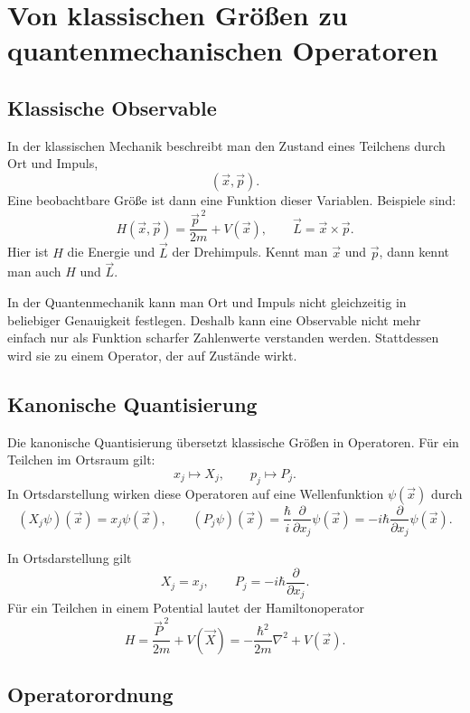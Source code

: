 \section{Von klassischen Größen zu quantenmechanischen Operatoren}

\subsection{Klassische Observable}

In der klassischen Mechanik beschreibt man den Zustand eines Teilchens durch Ort und Impuls,
\[
    (\vec x,\vec p).
\]
Eine beobachtbare Größe ist dann eine Funktion dieser Variablen. Beispiele sind:
\[
    H(\vec x,\vec p)=\frac{\vec p^{\,2}}{2m}+V(\vec x),
    \qquad
    \vec L=\vec x\times \vec p.
\]
Hier ist $H$ die Energie und $\vec L$ der Drehimpuls. Kennt man $\vec x$ und $\vec p$, dann kennt man auch $H$ und $\vec L$.

\begin{notebox}
In der Quantenmechanik kann man Ort und Impuls nicht gleichzeitig in beliebiger Genauigkeit festlegen. Deshalb kann eine Observable nicht mehr einfach nur als Funktion scharfer Zahlenwerte verstanden werden. Stattdessen wird sie zu einem Operator, der auf Zustände wirkt.
\end{notebox}

\subsection{Kanonische Quantisierung}

Die kanonische Quantisierung übersetzt klassische Größen in Operatoren. Für ein Teilchen im Ortsraum gilt:
\[
    x_j \longmapsto X_j,
    \qquad
    p_j \longmapsto P_j.
\]
In Ortsdarstellung wirken diese Operatoren auf eine Wellenfunktion $\psi(\vec x)$ durch
\[
    (X_j\psi)(\vec x)=x_j\psi(\vec x),
    \qquad
    (P_j\psi)(\vec x)=\frac{\hbar}{i}\frac{\partial}{\partial x_j}\psi(\vec x)
    =-i\hbar\frac{\partial}{\partial x_j}\psi(\vec x).
\]

\begin{formulabox}
In Ortsdarstellung gilt
\[
    X_j=x_j,
    \qquad
    P_j=-i\hbar\frac{\partial}{\partial x_j}.
\]
Für ein Teilchen in einem Potential lautet der Hamiltonoperator
\[
    H=\frac{\vec P^{\,2}}{2m}+V(\vec X)
    =-\frac{\hbar^2}{2m}\nabla^2+V(\vec x).
\]
\end{formulabox}

\subsection{Operatorordnung}

